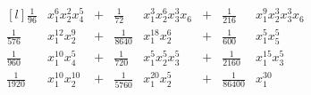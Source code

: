 \documentclass{article}
\begin{document}
$$\begin{matrix*}[l]
\frac{1}{96}&x_{1}^{6} x_{2}^{2} x_{4}^{5}&+&\frac{1}{72}&x_{1}^{3} x_{2}^{6} x_{3}^{3} x_{6}&+&\frac{1}{216}&x_{1}^{9} x_{2}^{3} x_{3}^{3} x_{6}\\
\frac{1}{576}&x_{1}^{12} x_{2}^{9}&+&\frac{1}{8640}&x_{1}^{18} x_{2}^{6}&+&\frac{1}{600}&x_{1}^{5} x_{5}^{5}\\
\frac{1}{960}&x_{1}^{10} x_{4}^{5}&+&\frac{1}{720}&x_{1}^{5} x_{2}^{5} x_{3}^{5}&+&\frac{1}{2160}&x_{1}^{15} x_{3}^{5}\\
\frac{1}{1920}&x_{1}^{10} x_{2}^{10}&+&\frac{1}{5760}&x_{1}^{20} x_{2}^{5}&+&\frac{1}{86400}&x_{1}^{30}
\end{matrix*}    
$$
\end{document}
